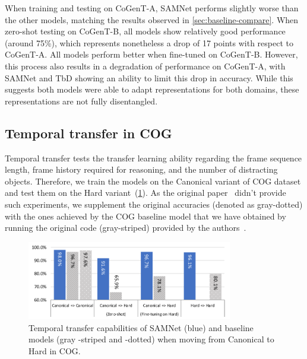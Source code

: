 When training and testing on CoGenT-A, SAMNet performs slightly worse than the other models, matching the results observed in \cref{sec:baseline-compare}.
When zero-shot testing on CoGenT-B, all models show relatively good performance (around 75\%), which represents nonetheless a drop of 17 points with respect to CoGenT-A.
All models perform better when fine-tuned on CoGenT-B.
However, this process also results in a degradation of performance on CoGenT-A, with SAMNet and TbD showing an ability to limit this drop in accuracy.
While this suggests both models were able to adapt representations for both domains, these representations are not fully disentangled.

\subsection{Temporal transfer in COG}
\label{sec:temporal}

Temporal transfer tests the transfer learning ability regarding the frame sequence length, frame history required for reasoning, and the number of distracting objects.
Therefore, we train the models on the Canonical variant of COG dataset and test them on the Hard variant~(\cref{fig:samnet_cog_overall_transfer}).
As the original paper~\cite{yang2018dataset} didn't provide such experiments, we supplement the original accuracies (denoted as gray-dotted) with the ones achieved by the COG baseline model that we have obtained by running the original code (gray-striped) provided by the authors~\cite{yang2018implement}.

\begin{figure}[htbp]
	\centering
	\includegraphics[width=0.8\textwidth]{../img/plots/cog_temporal_transfer_baselines.pdf}
	\caption{Temporal transfer capabilities of SAMNet (blue) and baseline models (gray -striped and -dotted) when moving from Canonical to Hard  in COG.}
	\label{fig:samnet_cog_overall_transfer}
\end{figure}

